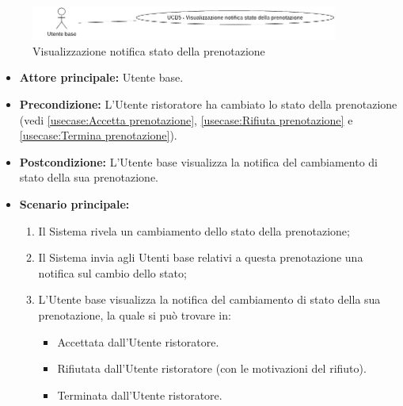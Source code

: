 \label{usecase:Visualizzazione notifica stato della prenotazione}

\begin{figure}[h]
	\centering
	\includegraphics[width=0.9\textwidth]{./uml/UCB5.png} 
	\caption{Visualizzazione notifica stato della prenotazione}
	\label{fig:UCB6}
  \end{figure}

\begin{itemize}
	\item \textbf{Attore principale:} Utente base.

	\item \textbf{Precondizione:} L'Utente ristoratore ha cambiato lo stato della prenotazione (vedi \autoref{usecase:Accetta prenotazione},
	      \autoref{usecase:Rifiuta prenotazione} e \autoref{usecase:Termina prenotazione}).


	\item \textbf{Postcondizione:} L'Utente base visualizza la notifica del cambiamento di stato della sua prenotazione.

	\item \textbf{Scenario principale:}
	      \begin{enumerate}
		      \item Il Sistema rivela un cambiamento dello stato della prenotazione;
		      \item Il Sistema invia agli Utenti base relativi a questa
		            prenotazione una notifica sul cambio dello stato;
		      \item L'Utente base visualizza la notifica del cambiamento di stato della sua prenotazione, la quale si può trovare in:
		            \begin{itemize}
			            \item Accettata dall'Utente ristoratore.
			            \item Rifiutata dall'Utente ristoratore (con le motivazioni del rifiuto).
			            \item Terminata dall'Utente ristoratore.
		            \end{itemize}
	      \end{enumerate}
\end{itemize}
